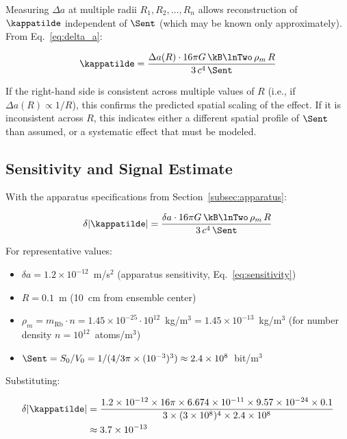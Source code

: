 Measuring $\Delta a$ at multiple radii $R_1, R_2, \ldots, R_n$ allows
reconstruction of $\kappatilde$ independent of $\Sent$ (which may be
known only approximately). From Eq.~\eqref{eq:delta_a}:

\begin{equation}
    \kappatilde = \frac{\Delta a(R)\cdot 16\pi G\,\kB\lnTwo\,\rho_m\,R}
    {3\,c^4\,\Sent}
    \label{eq:kappa_extraction}
\end{equation}

\noindent If the right-hand side is consistent across multiple values of
$R$ (i.e., if $\Delta a(R) \propto 1/R$), this confirms the predicted
spatial scaling of the effect. If it is inconsistent across $R$, this
indicates either a different spatial profile of $\Sent$ than assumed, or
a systematic effect that must be modeled.

\subsection{Sensitivity and Signal Estimate}
\label{subsec:sensitivity}

With the apparatus specifications from Section~\ref{subsec:apparatus}:

\begin{equation}
    \delta|\kappatilde| = \frac{\delta a \cdot 16\pi G\,\kB\lnTwo
    \,\rho_m\,R}{3\,c^4\,\Sent}
    \label{eq:kappa_sensitivity}
\end{equation}

\noindent For representative values:
\begin{itemize}
    \item $\delta a = 1.2\times10^{-12}$~m/s$^2$
    (apparatus sensitivity, Eq.~\eqref{eq:sensitivity})
    \item $R = 0.1$~m (10~cm from ensemble center)
    \item $\rho_m = m_{\mathrm{Rb}}\cdot n = 1.45\times10^{-25}
    \cdot 10^{12}$~kg/m$^3 = 1.45\times10^{-13}$~kg/m$^3$
    (for number density $n = 10^{12}$~atoms/m$^3$)
    \item $\Sent = S_0/V_0 = 1/(4/3\pi\times(10^{-3})^3)
    \approx 2.4\times10^8$~bit/m$^3$
\end{itemize}

\noindent Substituting:

\begin{align}
    \delta|\kappatilde| &= \frac{1.2\times10^{-12}
    \times 16\pi\times 6.674\times10^{-11}
    \times 9.57\times10^{-24}
    \times 0.1}
    {3\times(3\times10^8)^4 \times 2.4\times10^8}
    \nonumber \\
    &\approx 3.7\times10^{-13}
    \label{eq:sensitivity_numerical}
\end{align}

